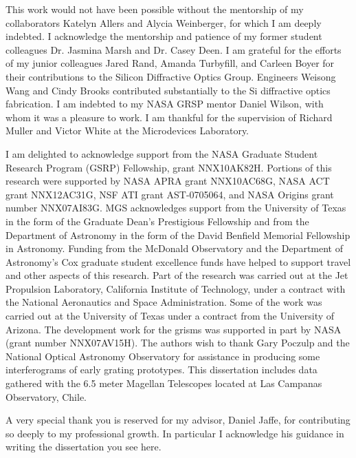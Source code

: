 \documentclass[12pt]{report}	%
\begin{document}
\begin{acknowledgments}		%
%

This work would not have been possible without the mentorship of my collaborators Katelyn Allers and Alycia Weinberger, for which I am deeply indebted.  I acknowledge the mentorship and patience of my former student colleagues Dr. Jasmina Marsh and Dr. Casey Deen.  I am grateful for the efforts of my junior colleagues Jared Rand, Amanda Turbyfill, and Carleen Boyer for their contributions to the Silicon Diffractive Optics Group.  Engineers Weisong Wang and Cindy Brooks contributed substantially to the Si diffractive optics fabrication.  I am indebted to my NASA GRSP mentor Daniel Wilson, with whom it was a pleasure to work.  I am thankful for the supervision of Richard Muller and Victor White at the Microdevices Laboratory.  

I am delighted to acknowledge support from the NASA Graduate Student Research Program (GSRP) Fellowship, grant NNX10AK82H.  Portions of this research were supported by NASA APRA grant NNX10AC68G, NASA ACT grant NNX12AC31G, NSF ATI grant AST-0705064, and NASA Origins grant number NNX07AI83G.  MGS acknowledges support from the University of Texas in the form of the Graduate Dean's Prestigious Fellowship and from the Department of Astronomy in the form of the David Benfield Memorial Fellowship in Astronomy.  Funding from the McDonald Observatory and the Department of Astronomy's Cox graduate student excellence funds have helped to support travel and other aspects of this research.  Part of the research was carried out at the Jet Propulsion Laboratory, California Institute of Technology, under a contract with the National Aeronautics and Space Administration.  Some of the work was carried out at the University of Texas under a contract from the University of Arizona.  The development work for the grisms was supported in part by NASA (grant number NNX07AV15H).  The authors wish to thank Gary Poczulp and the National Optical Astronomy Observatory for assistance in producing some interferograms of early grating prototypes.  This dissertation includes data gathered with the 6.5 meter Magellan Telescopes located at Las Campanas Observatory, Chile.


A very special thank you is reserved for my advisor, Daniel Jaffe, for contributing so deeply to my professional growth.  In particular I acknowledge his guidance in writing the dissertation you see here.  %

\end{acknowledgments}
\end{document}
